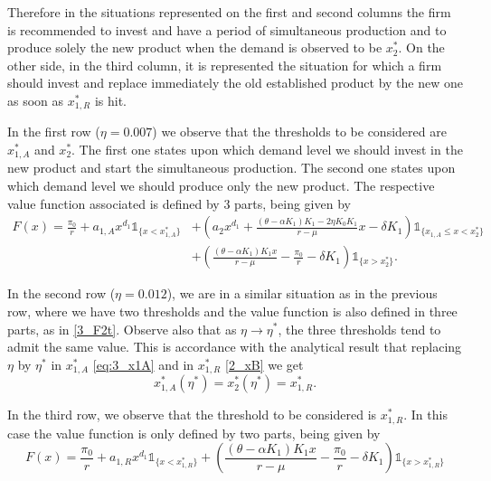Therefore in the situations represented on the first and second columns the firm is recommended to 
invest and have a period of simultaneous production and to produce solely the new product when the demand is observed to be $x^*_2$.
On the other side, in the third column, it is represented the situation for which a firm should invest and replace immediately the old established product by the new one as soon as $x^*_{1,R}$ is hit.

In the first row ($\eta=0.007$) we observe that the thresholds to be considered are $x_{1,A}^*$ and $x_2^*$. The first one states upon which demand level we should invest in the new product and start the simultaneous production. The second one states upon which demand level we should produce only the new product. The respective value function associated is defined by 3 parts, being given by 
\begin{equation}
\begin{split}
F(x)=\frac{\pi_0}{r}+
	a_{1,A}x^{d_1}  \mathds{1}_{ \{x<x^*_{1,A} \}}&+
	\left( a_2x^{d_1}+\frac{(\theta-\alpha K_1)K_1-2 \eta K_0 K_1}{r-\mu} x - \delta K_1 \right)  \mathds{1}_{ \{ x_{1,A} \leq x < x_2^* \}}\\
	&+
	\left(  \frac{(\theta-\alpha K_1)K_1 x}{r-\mu} -\frac{\pi_0}{r} - \delta K_1 \right)   \mathds{1}_{ \{ x>x_2^*  \} }.
\end{split}
	\label{3_F2t}
\end{equation}	

In the second row ($\eta=0.012$), we are in a similar situation as in the previous row, where we have two thresholds and the value function is also defined in three parts, as in \eqref{3_F2t}.
Observe also that as $\eta \to \eta^*$, the three thresholds tend to admit the same value. This is accordance with the analytical result that replacing $\eta$ by $\eta^*$ in $x^*_{1,A}$ \eqref{eq:3_x1A} and in $x^*_{1,R}$ \eqref{2_xB} we get
$$x^*_{1,A}(\eta^*)=x_2^*(\eta^*)=x^*_{1,R}.$$


In the third row, we observe that the threshold to be considered is $x_{1,R}^*$. In this case the value function is only defined by two parts, being given by
$$F(x)=\frac{\pi_0}{r}+
	a_{1,R}x^{d_1} \mathds{1}_{ \{ x<x_{1,R}^* \} }+
	\left(  \frac{(\theta-\alpha K_1)K_1 x}{r-\mu} -\frac{\pi_0}{r} - \delta K_1 \right)  \mathds{1}_{ \{ x>x_{1,R}^* \} }$$

